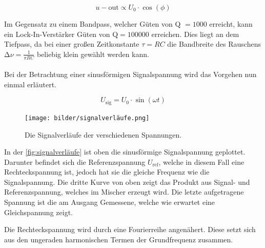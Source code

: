     \begin{equation*}
        u-{\text{out}} \propto U_0 \cdot \cos(\phi)
    \end{equation*}

    \noindent Im Gegensatz zu einem Bandpass, welcher Güten von Q $= \num{1000}$ erreicht, kann ein Lock-In-Verstärker Güten von Q$= \num{100000}$ erreichen. Dies liegt an dem 
    Tiefpass, da bei einer großen Zeitkonstante $ \tau = RC$ die Bandbreite des Rauschens $\increment \nu = \frac{1}{\pi RC}$ beliebig klein gewählt werden kann.
    \\
    \\

    \noindent Bei der Betrachtung einer sinusförmigen Signalspannung wird das Vorgehen nun einmal erläutert. 

    \begin{equation*}
        U_{\text{sig}} = U_0 \cdot \sin(\omega t)
    \end{equation*}

    \begin{figure}
        \centering
        \texttt{[image: bilder/signalverläufe.png]}
        \caption{Die Signalverläufe der verschiedenen Spannungen.}
        \label{fig:signalverläufe}
    \end{figure}

    \noindent In der \autoref{fig:signalverläufe} ist oben die sinusförmige Signalspannung geplottet. Darunter befindet sich die Referenzspannung $U_{\text{ref}}$, welche in diesem 
    Fall eine Rechteckspannung ist, jedoch hat sie die gleiche Frequenz wie die Signalspannung. Die dritte Kurve von oben zeigt das Produkt aus Signal- und Referenzspannung, welches
    im Mischer erzeugt wird. Die letzte aufgetragene Spannung ist die am Ausgang Gemessene, welche wie erwartet eine Gleichspannung zeigt. 

    \noindent Die Rechteckspannung wird durch eine Fourierreihe angenähert. Diese setzt sich aus den ungeraden harmonischen Termen der Grundfrequenz zusammen.

